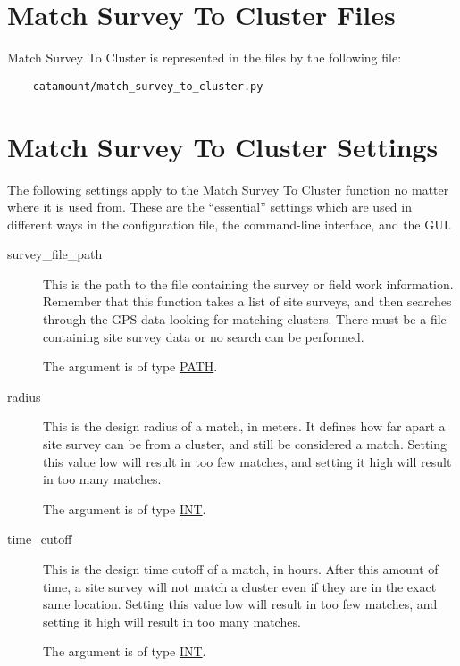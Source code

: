 \section{Match Survey To Cluster Files}

Match Survey To Cluster is represented in the files by the following
file:

\begin{verbatim}
    catamount/match_survey_to_cluster.py
\end{verbatim}

\section{Match Survey To Cluster Settings}
\hypertarget{survey-to-cluster-settings}{}

The following settings apply to the Match Survey To Cluster function
no matter where it is used from. These are the ``essential'' settings
which are used in different ways in the configuration file, the
command-line interface, and the GUI.

\begin{description}

\item[survey\_file\_path]
\hypertarget{survey-to-cluster-survey-file-path}{}

This is the path to the file containing the survey or field work
information. Remember that this function takes a list of site surveys,
and then searches through the GPS data looking for matching clusters.
There must be a file containing site survey data or no search can be
performed.

The argument is of type \hyperlink{argument-type-path}{PATH}.

\item[radius]
\hypertarget{survey-to-cluster-radius}{}

This is the design radius of a match, in meters. It defines how far
apart a site survey can be from a cluster, and still be considered a
match. Setting this value low will result in too few matches, and
setting it high will result in too many matches.

The argument is of type \hyperlink{argument-type-int}{INT}.

\item[time\_cutoff]
\hypertarget{survey-to-cluster-time-cutoff}{}

This is the design time cutoff of a match, in hours. After this amount of time,
a site survey will not match a cluster even if they are in the exact
same location. Setting this value low will result in too few matches,
and setting it high will result in too many matches.

The argument is of type \hyperlink{argument-type-int}{INT}.

\end{description}


